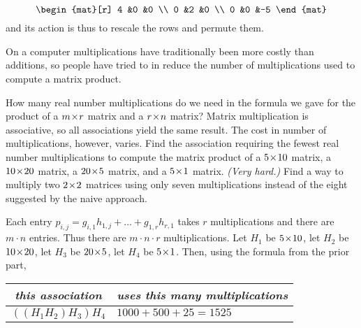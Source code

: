 \begin{exercises}
\begin{answer}
\begin{equation*}
        \begin{mat}[r]
          4  &0  &0  \\
          0  &2  &0  \\
          0  &0  &-5
        \end{mat}
      \end{equation*}
      and its action is thus to rescale the rows and permute them.
    \end{answer}
  \item 
    On a computer multiplications have traditionally been 
    more costly than additions, so
    people have tried to in reduce the number of multiplications used to
    compute a matrix product.
    \begin{exparts}
      \partsitem How many real number multiplications do we need in the formula 
        we gave for the product of a
        \( m \! \times \! r \) matrix and a \( r \! \times \! n \) matrix?
      \partsitem 
        Matrix multiplication is associative, so all associations yield
        the same result.
        The cost in number of multiplications, however, varies.
        Find the association requiring the fewest real number multiplications
        to compute the matrix product of
        a \( 5 \! \times \! 10 \) matrix,
        a \( 10 \! \times \! 20 \) matrix,
        a \( 20 \! \times \! 5 \) matrix, and
        a \( 5 \! \times \! 1 \) matrix.
      \partsitem \textit{(Very hard.)}
        Find a way to multiply two \( 2 \! \times \! 2 \) matrices using only seven
        multiplications instead of the eight suggested by the naive approach.
    \end{exparts}
    \begin{answer}
      \begin{exparts}
        \partsitem Each entry \(p_{i,j}=g_{i,1}h_{1,j}+\dots+g_{1,r}h_{r,1}  \)
          takes \( r \) multiplications and there are \( m\cdot n \) entries.
          Thus there are \( m\cdot n\cdot r \) multiplications.
        \partsitem Let \( H_1 \) be \( 5 \! \times \! 10 \),
           let \( H_2 \) be \( 10 \! \times \! 20 \),
           let \( H_3 \) be \( 20 \! \times \! 5 \),
           let \( H_4 \) be \( 5 \! \times \! 1 \).
           Then, using the formula from the prior part, 
           \begin{center}
             \begin{tabular}{l|l}
               \multicolumn{1}{c}{\textit{this association}}  
                &\multicolumn{1}{c}{\textit{uses this many multiplications}}\\ 
               \hline
               \( ((H_1H_2)H_3)H_4 \)     &\( 1000+500+25=1525 \)  \\

\end{tabular}
\end{center}
\end{exparts}
\end{answer}
\end{exercises}
